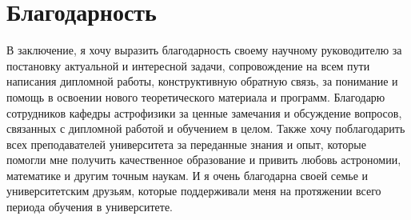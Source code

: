 \section*{Благодарность}

В заключение, я хочу выразить благодарность своему научному руководителю за постановку актуальной и интересной задачи, сопровождение на всем пути написания дипломной работы, конструктивную обратную связь, за понимание и помощь в освоении нового теоретического материала и программ. Благодарю сотрудников кафедры астрофизики за ценные замечания и обсуждение вопросов, связанных с дипломной работой и обучением в целом. Также хочу поблагодарить всех преподавателей университета за переданные знания и опыт, которые помогли мне получить качественное образование и привить любовь астрономии, математике и другим точным наукам. И я очень благодарна своей семье и университетским друзьям, которые поддерживали меня на протяжении всего периода обучения в университете. 